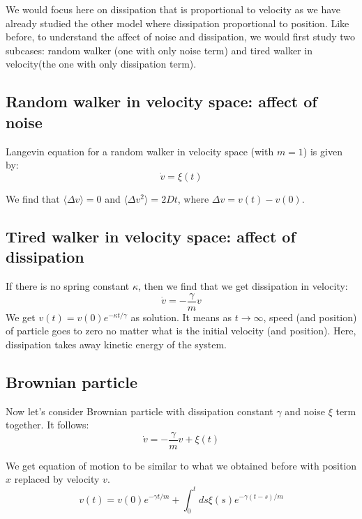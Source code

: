 \documentclass[11pt,a4paper]{article}
\begin{document}
We would focus here on dissipation that is proportional to velocity as we have already studied the other model where dissipation proportional to position. Like before, to understand the affect of noise and dissipation, we would first study two subcases: random walker (one with only noise term) and tired walker in velocity(the one with only dissipation term). 





\subsection*{Random walker in velocity space: affect of noise}
Langevin equation for a random walker in velocity space (with $m=1$) is given by:
\begin{equation}
\dot{v}=  \xi(t)
\end{equation}

We find that  $\langle \Delta v\rangle=0$ and $\langle \Delta v ^2\rangle=2 Dt$, where $\Delta v= v(t)-v(0)$.


\subsection*{Tired walker in velocity space: affect of dissipation}

If there is no spring constant $\kappa$, then  we find that we get dissipation in velocity:
\begin{equation}
\dot{v}=  - \frac{\gamma } {m}v 
\end{equation}
We get $v(t)=v(0) e^{-\kappa t/\gamma}$ as solution. It means as $t\rightarrow \infty$, speed (and position) of particle goes to zero no matter what is the initial velocity (and position). Here, dissipation takes away kinetic energy of the system. 

\subsection*{Brownian particle}
Now let's consider Brownian particle with dissipation constant $\gamma$ and noise $\xi$ term together. It follows:
\begin{equation}
\dot{v}= -\dfrac{\gamma}{m} v + \xi(t)
\label{eom_vel}
\end{equation}




We get equation of motion to be similar to what we obtained before with position $x$ replaced by velocity $v$.
\begin{equation}
v(t)= v(0) e^{-\gamma t /m} + \int_0^t ds  \xi(s) e^{-\gamma (t-s)/m} 
\label{sol_vel}
\end{equation}
\end{document}
